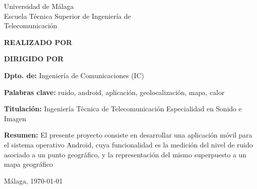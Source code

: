
\thispagestyle{empty}
\begin{center}
	\Large \sffamily
	Universidad de Málaga\\
	Escuela Técnica Superior de Ingeniería de\\
	Telecomunicación
\end{center}

\bigskip

\begin{center}
	\Huge\scshape
	\pfctitlename
\end{center}

\bigskip

\begin{center}
	\textbf{REALIZADO POR}\\
	\textsf{\pfcauthorname}
\end{center}

\medskip

\begin{center}
	\textbf{DIRIGIDO POR}\\
	\textsf{\pfctutorname}
\end{center}

\vfill

\begin{minipage}{\textwidth}
\textbf{Dpto. de:} Ingeniería de Comunicaciones (IC)

\medskip

\textbf{Palabras clave:} ruido, android, aplicación, geolocalización, mapa, calor

\medskip

\textbf{Titulación:} Ingeniería Técnica de Telecomunicación Especialidad en Sonido e Imagen

\medskip

\textbf{Resumen:}
	El presente proyecto consiste en desarrollar una aplicación móvil para el sistema operativo Android, cuya funcionalidad es la medición del nivel de ruido asociado a un punto geográfico, y la representación del mismo superpuesto a un mapa geográfico

\begin{center} Málaga, \today\end{center}
\end{minipage}

\blankpage